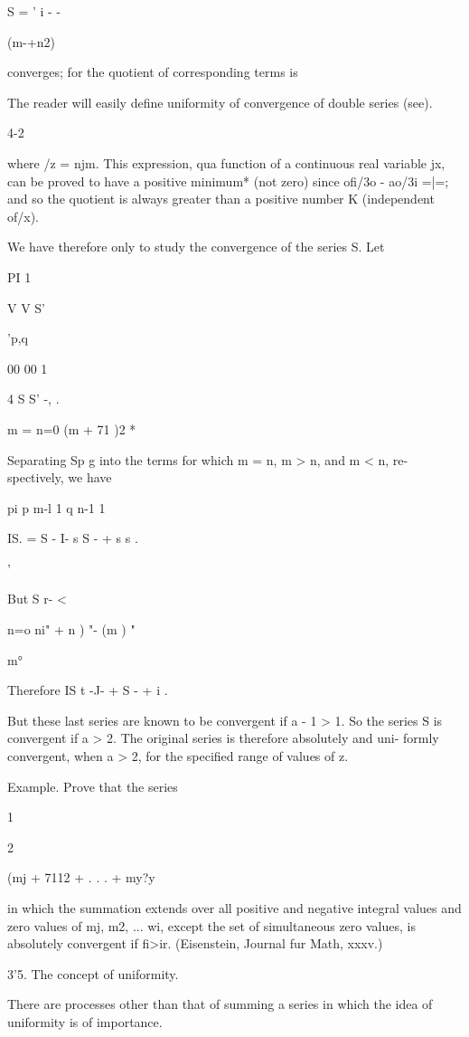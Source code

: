 S = ' i - -

(m-+n2)

converges; for the quotient of corresponding terms is

The reader will easily define uniformity of convergence of double
series (see).

4-2

%
%

where /z = njm. This expression, qua function of a continuous real
variable jx, can be proved to have a positive minimum* (not zero)
since ofi/3o - ao/3i =|=; and so the quotient is always greater than
a positive number K (independent of/x).

We have therefore only to study the convergence of the series S. Let

PI 1

V V S'

 'p,q

00 00 1

 4 S S' -, .

m = n=0 (m + 71 )2 *

Separating Sp g into the terms for which m = n, m > n, and m < n, re-
spectively, we have

pi p m-l 1 q n-1 1

IS. = S - I- s S - + s s .

'%

But S r- <

n=o ni" + n ) "- (m ) "

m°

Therefore IS t -J- + S - + i .

But these last series are known to be convergent if a - 1 > 1. So the
series S is convergent if a > 2. The original series is therefore
absolutely and uni- formly convergent, when a > 2, for the specified
range of values of z.

Example. Prove that the series

1

2

(mj + 7112 + . . . + my?y

in which the summation extends over all positive and negative integral
values and zero values of mj, m2, ... wi, except the set of
simultaneous zero values, is absolutely convergent if fi>ir.
(Eisenstein, Journal fur Math, xxxv.)

3'5. The concept of uniformity.

There are processes other than that of summing a series in which the
idea of uniformity is of importance.

